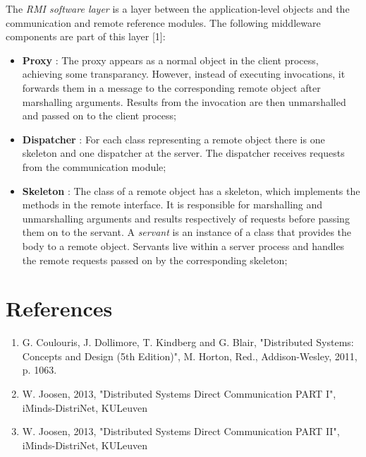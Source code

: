The \emph{RMI software layer} is a layer between the application-level objects and the communication and remote reference modules. The following middleware components are part of this layer [1]:

\begin{itemize}
	\item \textbf{Proxy} : The proxy appears as a normal object in the client process, achieving some transparancy. However, instead of executing invocations, it forwards them in a message to the corresponding remote object after marshalling arguments. Results from the invocation are then unmarshalled and passed on to the client process;
	\item \textbf{Dispatcher} : For each class representing a remote object there is one skeleton and one dispatcher at the server. The dispatcher receives requests from the communication module;
	\item \textbf{Skeleton} : The class of a remote object has a skeleton, which implements the methods in the remote interface. It is responsible for marshalling and unmarshalling arguments and results respectively of requests before passing them on to the servant. A \emph{servant} is an instance of a class that provides the body to a remote object. Servants live within a server process and handles the remote requests passed on by the corresponding skeleton;
\end{itemize}




\section*{References}

\begin{enumerate}[1]
	\item G. Coulouris, J. Dollimore, T. Kindberg and G. Blair, "Distributed Systems: Concepts and Design (5th Edition)", M. Horton, Red., Addison-Wesley, 2011, p. 1063.
	\item W. Joosen, 2013, "Distributed Systems Direct Communication PART I", iMinds-DistriNet, KULeuven
	\item W. Joosen, 2013, "Distributed Systems Direct Communication PART II", iMinds-DistriNet, KULeuven
\end{enumerate}